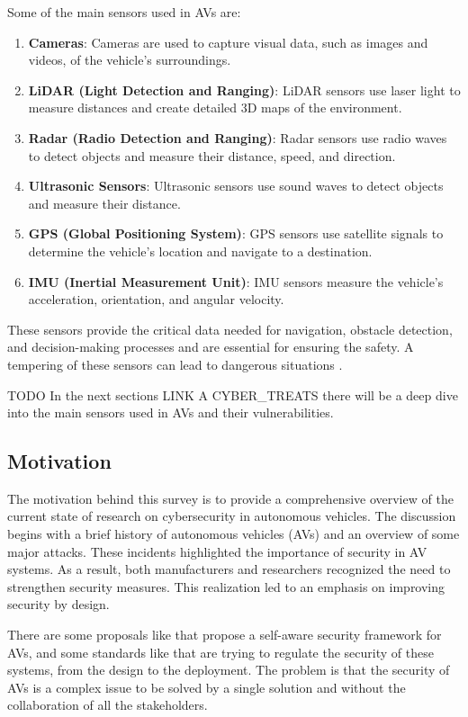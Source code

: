 Some of the main sensors used in AVs are:
\begin{enumerate}
    \item \textbf{Cameras}: Cameras are used to capture visual data, such as images and videos, of the vehicle's surroundings.
    \item \textbf{LiDAR (Light Detection and Ranging)}: LiDAR sensors use laser light to measure distances and create detailed 3D maps of the environment.
    \item \textbf{Radar (Radio Detection and Ranging)}: Radar sensors use radio waves to detect objects and measure their distance, speed, and direction.
    \item \textbf{Ultrasonic Sensors}: Ultrasonic sensors use sound waves to detect objects and measure their distance.
    \item \textbf{GPS (Global Positioning System)}: GPS sensors use satellite signals to determine the vehicle's location and navigate to a destination.
    \item \textbf{IMU (Inertial Measurement Unit)}: IMU sensors measure the vehicle's acceleration, orientation, and angular velocity.
\end{enumerate}

These sensors provide the critical data needed for navigation, obstacle
detection, and decision-making processes and are essential for ensuring the safety.
A tempering of these sensors can lead to dangerous situations \cite{unknown2020connected,cybersec} .

TODO In the next sections LINK A CYBER_TREATS there will be a deep dive into the main sensors used in AVs and their vulnerabilities.


\subsection{Motivation}\label{subsec:motivation}

The motivation behind this survey is to provide a comprehensive overview of the current state of research on cybersecurity in autonomous vehicles.
The discussion begins with a brief history of autonomous vehicles (AVs) and an overview of some major attacks.
These incidents highlighted the importance of security in AV systems.
As a result, both manufacturers and researchers recognized the need to strengthen security measures.
This realization led to an emphasis on improving security by design.

There are some proposals like \cite{adu-kyere2023self-aware} that propose a self-aware security framework for AVs, and some standards like \cite{iso_21434_2021} that are trying to regulate the security of these systems, from the design to the deployment.
The problem is that the security of AVs is a complex issue to be solved by a single solution and without the collaboration of all the stakeholders.

